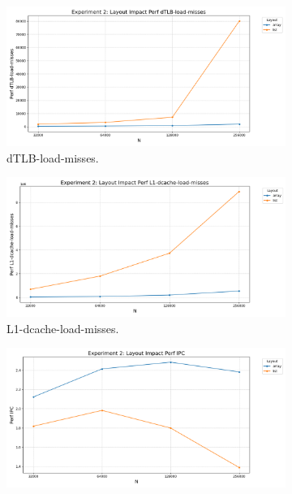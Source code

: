 \documentclass[11pt, a4paper]{article}
\begin{document}
\begin{figure}[h]
    \centering
    \begin{subfigure}[b]{0.32\textwidth}
        \centering
        \includegraphics[width=\textwidth]{plots/experiment_2_layout_impact_dtlb-load-misses.png}
        \caption{dTLB-load-misses.}
        \label{fig:exp2_dtlb}
    \end{subfigure}
    \hfill
    \begin{subfigure}[b]{0.32\textwidth}
        \centering
        \includegraphics[width=\textwidth]{plots/experiment_2_layout_impact_l1-dcache-load-misses.png}
        \caption{L1-dcache-load-misses.}
        \label{fig:exp2_l1dcache}
    \end{subfigure}
    \hfill
    \begin{subfigure}[b]{0.32\textwidth}
        \centering
        \includegraphics[width=\textwidth]{plots/experiment_2_layout_impact_ipc.png}

\end{subfigure}
\end{figure}
\end{document}
